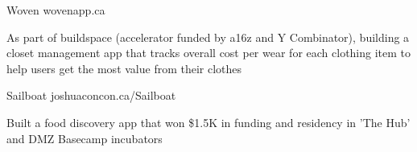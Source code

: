 \begin{cventries}
  \cventry
    {}
    {Woven}
    {}
    {wovenapp.ca}
    {}
    {
      \begin{cvitems}
        \item {As part of buildspace (accelerator funded by a16z and Y Combinator), building a closet management app that tracks overall cost per wear for each clothing item to help users get the most value from their clothes}
      \end{cvitems}
    }
  \cventry
    {}
    {Sailboat}
    {}
    {joshuaconcon.ca/Sailboat}
    {}
    {
      \begin{cvitems}
        \item {Built a food discovery app that won \$1.5K in funding and residency in 'The Hub' and DMZ Basecamp incubators}
      \end{cvitems}
    }
\end{cventries}
